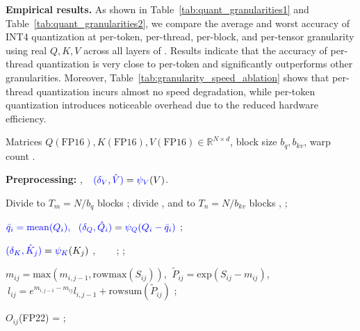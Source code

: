 \textbf{Empirical results.}
As shown in Table~\ref{tab:quant_granularities1} and Table~\ref{tab:quant_granularities2}, we compare the average and worst accuracy of INT4 quantization at per-token, per-thread, per-block, and per-tensor granularity using real $Q, K, V$ across all layers of \cogvideo. Results indicate that the accuracy of per-thread quantization is very close to per-token and significantly outperforms other granularities. Moreover, Table~\ref{tab:granularity_speed_ablation} shows that per-thread quantization incurs almost no speed degradation, while per-token quantization introduces noticeable overhead due to the reduced hardware efficiency.




\begin{algorithm*}[htb!]
    \small
    \caption{Implementation of \our.}
    \label{alg:our} 
    \begin{algorithmic}
     {Matrices $Q(\text{FP16}), K(\text{FP16}), V(\text{FP16}) \in \mathbb{R}^{N \times d}$, block size $b_q, b_{kv}$, warp count .}
    

    \STATE \textbf{Preprocessing:} , $~~\textcolor{blue}{{(\delta_V, \hat V)}} = \textcolor{blue}{{\psi_V}}(V)$. 
    

    \STATE Divide  to $T_m = {N}/{b_q}$ blocks ; divide , and  to $T_n = {N}/{b_{kv}}$ blocks , ;  


      \STATE $\textcolor{blue}{{\bar q_i=\mathrm{mean}(Q_i),~~ (\delta_Q, \hat Q_i)}} = \textcolor{blue}{{\psi_Q(Q_i - \bar q_i)}}$  ; 

            \STATE $\textcolor{blue}{{(\delta_K, \hat K_j)}} = \textcolor{blue}{{\psi_K}}(K_j)$ ,   ~~~  ; 
            \STATE {} ;  

            \STATE $m_{ij} = \mathrm{max}(m_{i,j-1}, \mathrm{rowmax}(S_{ij}))$, $~\widetilde P_{ij} = \mathrm{exp}(S_{ij} - m_{ij})$, $~l_{ij} = e^{m_{i,j-1}-m_{ij}} l_{i,j-1} + \mathrm{rowsum}(\widetilde P_{ij})$ ;

            \STATE $O_{ij}$(FP22) =  ;
            

\end{algorithmic}
\end{algorithm*}
